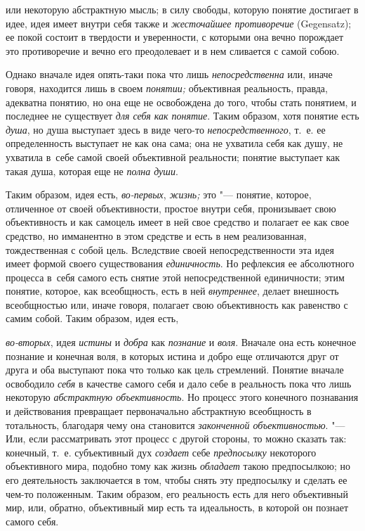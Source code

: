 или некоторую абстрактную мысль; в силу свободы, которую
понятие достигает в идее, идея имеет внутри себя также и
{\em жесточайшее противоречие}
(Gegensatz); ее покой состоит в твердости и уверенности, с
которыми она вечно порождает это противоречие и вечно его преодолевает и в
нем сливается с самой собою.

Однако вначале идея опять-таки пока что лишь
{\em непосредственна}
или, иначе говоря, находится лишь в своем
{\em понятии;}
объективная реальность, правда, адекватна понятию, но она еще
не освобождена до того, чтобы стать понятием, и последнее не существует
{\em для себя как понятие}.
Таким образом, хотя понятие есть
{\em душа}, но душа
выступает здесь в виде чего-то
{\em непосредственного},
т.~е. ее определенность выступает не как она сама; она не
ухватила себя как душу, не ухватила в~себе самой своей объективной
реальности; понятие выступает как такая душа, которая еще не
{\em полна души}.

Таким образом, идея есть,
{\em во-первых},
{\em жизнь;} это
"--- понятие, которое, отличенное от своей объективности,
простое внутри себя, пронизывает свою объективность и как самоцель имеет в
ней свое средство и полагает ее как свое средство, но имманентно в этом
средстве и есть в нем реализованная, тождественная с собой цель. Вследствие
своей непосредственности эта идея имеет формой своего существования
{\em единичность}. Но
рефлексия ее абсолютного процесса в~себя самого есть снятие этой
непосредственной единичности; этим понятие, которое, как всеобщность, есть
в ней {\em внутреннее},
делает внешность всеобщностью или, иначе говоря, полагает
свою объективность как равенство с самим собой. Таким образом, идея есть,

{\em во-вторых}, идея
{\em истины} и
{\em добра} как
{\em познание} и
{\em воля}. Вначале она
есть конечное познание и конечная воля, в которых истина и добро еще
отличаются друг от друга и оба выступают пока что только как цель
стремлений. Понятие вначале освободило
{\em себя} в качестве
самого себя и дало себе в реальность пока что лишь некоторую
{\em абстрактную объективность}.
Но процесс этого конечного познавания и действования
превращает первоначально абстрактную всеобщность в тотальность, благодаря
чему она становится {\em законченной
объективностью}. "--- Или, если рассматривать этот процесс с
другой стороны, то можно сказать так: конечный, т.~е. субъективный дух
{\em создает} себе
{\em предпосылку}
некоторого объективного мира, подобно тому как жизнь
{\em обладает} такою
предпосылкою; но его деятельность заключается в том, чтобы
снять эту предпосылку и сделать ее чем-то положенным. Таким образом, его
реальность есть для него объективный мир, или, обратно, объективный мир
есть та идеальность, в которой он познает самого себя.

